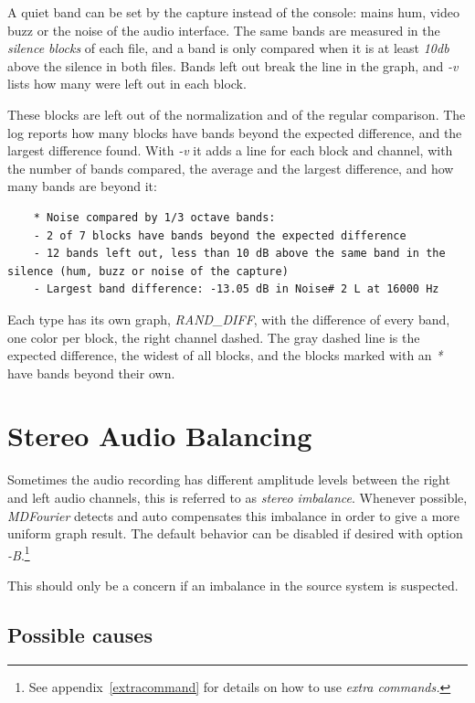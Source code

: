 \documentclass[10pt,a4paper]{report}
\newcommand{\db}[1]{\textit{\mbox{#1\acrshort{db}}}}
\begin{document}
\begin{appendices}
A quiet band can be set by the capture instead of the console: mains hum, video buzz or the noise of the audio interface. The same bands are measured in the \textit{silence blocks} of each file, and a band is only compared when it is at least \db{10} above the silence in both files. Bands left out break the line in the graph, and \textit{-v} lists how many were left out in each block.

These blocks are left out of the normalization and of the regular comparison. The log reports how many blocks have bands beyond the expected difference, and the largest difference found. With \textit{-v} it adds a line for each block and channel, with the number of bands compared, the average and the largest difference, and how many bands are beyond it:

\begin{verbatim}
	* Noise compared by 1/3 octave bands:
	- 2 of 7 blocks have bands beyond the expected difference
	- 12 bands left out, less than 10 dB above the same band in the silence (hum, buzz or noise of the capture)
	- Largest band difference: -13.05 dB in Noise# 2 L at 16000 Hz
\end{verbatim}

Each type has its own graph, \textit{RAND\_DIFF}, with the difference of every band, one color per block, the right channel dashed. The gray dashed line is the expected difference, the widest of all blocks, and the blocks marked with an \textit{*} have bands beyond their own.

\chapter{Stereo Audio Balancing}
\label{stereobalancing}

Sometimes the audio recording has different amplitude levels between the right and left audio channels, this is referred to as \textit{stereo imbalance}. Whenever possible, \textit{MDFourier} detects and auto compensates this imbalance in order to give a more uniform graph result. The default behavior can be disabled if desired with option \textit{-B}.\footnote{See appendix~\ref{extracommand} for details on how to use \textit{extra commands.}}

This should only be a concern if an imbalance in the source system is suspected. 

\section{Possible causes}


\end{appendices}
\end{document}
